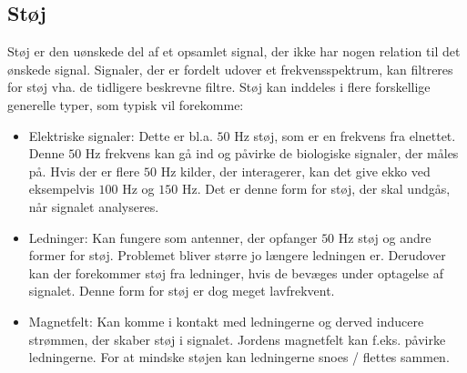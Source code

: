\subsection{Støj}\label{StoejAfsnit}
Støj er den uønskede del af et opsamlet signal, der ikke har nogen relation til det ønskede signal. Signaler, der er fordelt udover et frekvensspektrum, kan filtreres for støj vha. de tidligere beskrevne filtre. \cite{Devasahayam2000,Wolf2004}
Støj kan inddeles i flere forskellige generelle typer, som typisk vil forekomme:

\begin{itemize}
\item Elektriske signaler: Dette er bl.a. $50$ Hz støj, som er en frekvens fra elnettet. Denne $50$ Hz frekvens kan gå ind og påvirke de biologiske signaler, der måles på. Hvis der er flere $50$ Hz kilder, der interagerer, kan det give ekko ved eksempelvis $100$ Hz og $150$ Hz. Det er denne form for støj, der skal undgås, når signalet analyseres.
\item Ledninger: Kan fungere som antenner, der opfanger $50$ Hz støj og andre former for støj. Problemet bliver større jo længere ledningen er. Derudover kan der forekommer støj fra ledninger, hvis de bevæges under optagelse af signalet. Denne form for støj er dog meget lavfrekvent. \cite{webster2009}
\item Magnetfelt: Kan komme i kontakt med ledningerne og derved inducere strømmen, der skaber støj i signalet. Jordens magnetfelt kan f.eks. påvirke ledningerne. For at mindske støjen kan ledningerne snoes / flettes sammen. \cite{Wolf2004}
\end{itemize} 